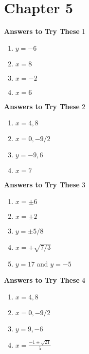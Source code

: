 \documentclass[a4paper]{JAC2003}
\begin{document}
\section{Chapter 5}

\noindent\textcolor{red!75!black}{\textbf{Answers to Try These}} 1
\begin{enumerate}
\item $y=-6$

\item $x=8$

\item $x=-2$

\item $x=6$
\end{enumerate}

\noindent\textcolor{red!75!black}{\textbf{Answers to Try These}} 2
\begin{enumerate}
\item $x=4,8$

\item $x=0,-9 / 2$

\item $y=-9,6$

\item $x=7$
\end{enumerate}

\noindent\textcolor{red!75!black}{\textbf{Answers to Try These}} 3
\begin{enumerate}
\item $x=\pm 6$

\item $x=\pm 2$

\item $y=\pm 5 / 8$

\item $x=\pm \sqrt{7 / 3}$

\item $y=17$ and $y=-5$
\end{enumerate}

\noindent\textcolor{red!75!black}{\textbf{Answers to Try These}} 4
\begin{enumerate}
\item $x=4,8$

\item $x=0,-9 / 2$

\item $y=9,-6$ %

\item $x=\frac{-1 \pm \sqrt{21}}{5}$
\end{enumerate}
\end{document}
